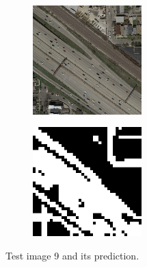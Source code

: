 \documentclass[10pt,conference,compsocconf]{IEEEtran}
\begin{document}
\begin{figure}[htbp]
	\centering
	\begin{subfigure}[htb]{0.2\textwidth}
		\includegraphics[width=4.2cm]{images/visualize_pred/images/test_9.png}
		\label{fig:test9}
	\end{subfigure}
	\hspace{1.5em}
	\begin{subfigure}[htb]{0.2\textwidth}
		\includegraphics[width=4.2cm]{images/visualize_pred/groundtruth/pred_9.png}
		\label{fig:pred9}
	\end{subfigure}
	\caption{Test image 9 and its prediction.}
\end{figure}
\end{document}
